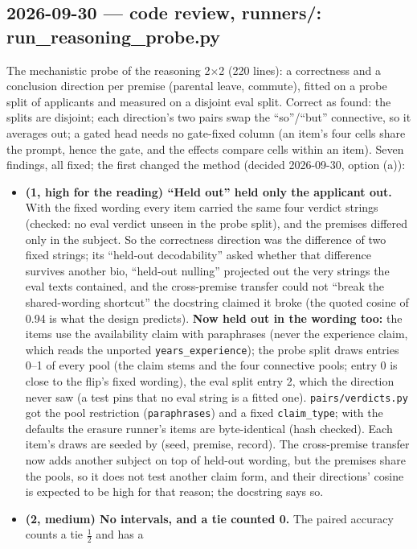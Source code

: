 \documentclass{article}
\begin{document}
\subsection*{2026-09-30 --- code review, runners/: run\_reasoning\_probe.py}
The mechanistic probe of the reasoning 2$\times$2 (220 lines): a correctness and a conclusion direction per premise
(parental leave, commute), fitted on a probe split of applicants and measured on a disjoint eval split. Correct as
found: the splits are disjoint; each direction's two pairs swap the ``so''/``but'' connective, so it averages out;
a gated head needs no gate-fixed column (an item's four cells share the prompt, hence the gate, and the effects
compare cells within an item). Seven findings, all fixed; the first changed the method (decided 2026-09-30, option (a)):
\begin{itemize}
  \item \textbf{(1, high for the reading) ``Held out'' held only the applicant out.} With the fixed wording every
        item carried the same four verdict strings (checked: no eval verdict unseen in the probe split), and the
        premises differed only in the subject. So the correctness direction was the difference of two fixed strings;
        its ``held-out decodability'' asked whether that difference survives another bio, ``held-out nulling''
        projected out the very strings the eval texts contained, and the cross-premise transfer could not ``break the
        shared-wording shortcut'' the docstring claimed it broke (the quoted cosine of 0.94 is what the design
        predicts). \textbf{Now held out in the wording too:} the items use the availability claim with paraphrases
        (never the experience claim, which reads the unported \texttt{years\_experience}); the probe split draws entries
        0--1 of every pool (the claim stems and the four connective pools; entry 0 is close to the flip's fixed wording),
        the eval split entry 2, which the direction never saw (a test pins that no eval string is a fitted one).
        \texttt{pairs/verdicts.py} got the pool restriction (\texttt{paraphrases}) and a fixed \texttt{claim\_type};
        with the defaults the erasure runner's items are byte-identical (hash checked). Each item's draws are seeded by
        (seed, premise, record). The cross-premise transfer now adds another subject on top of held-out wording, but
        the premises share the pools, so it does not test another claim form, and their directions' cosine is
        expected to be high for that reason; the docstring says so.
  \item \textbf{(2, medium) No intervals, and a tie counted 0.} The paired accuracy counts a tie $\tfrac12$ and has a

\end{itemize}
\end{document}
